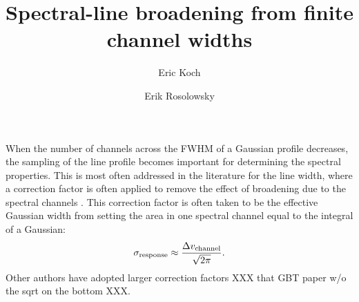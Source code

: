 \documentclass{rnaastex}
\begin{document}
\title{Spectral-line broadening from finite channel widths}

\author[0000-0001-9605-780X]{Eric Koch}
\author[0000-0002-5204-2259]{Erik Rosolowsky}


\keywords{}


\section{}

When the number of channels across the FWHM of a Gaussian profile decreases, the sampling of the line profile becomes important for determining the spectral properties.  This is most often addressed in the literature for the line width, where a correction factor is often applied to remove the effect of broadening due to the spectral channels \citep[e.g.,][]{cprops2006PASP..118..590R}. This correction factor is often taken to be the effective Gaussian width from setting the area in one spectral channel equal to the integral of a Gaussian:
\begin{equation}
    \label{eq:width_corr_fact}
    \sigma_{\rm response} \approx \frac{\Delta v_{\rm channel}}{\sqrt{2\pi}}.
\end{equation}
Other authors have adopted larger correction factors XXX that GBT paper w/o the sqrt on the bottom XXX.
\end{document}
